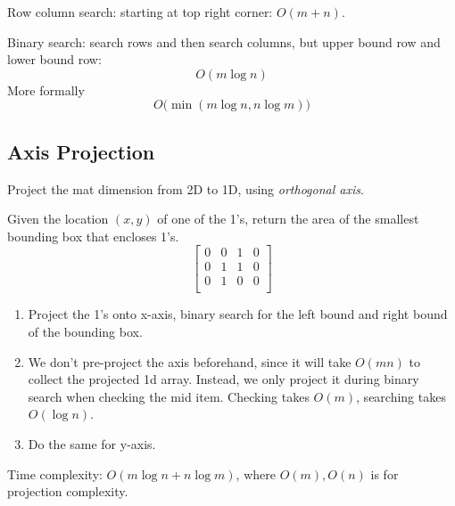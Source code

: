 Row column search: starting at top right corner: $O(m+n)$.

Binary search: search rows and then search columns, but upper bound row and lower bound row: 
$$
O(m \log n)
$$
More formally 
$$O\big(\min(m\log n, n\log m)\big)$$
\subsection{Axis Projection}
Project the mat dimension from 2D to 1D, using \textit{orthogonal axis}.

 Given the location $(x, y)$ of one of the 1's, return the area of the smallest bounding box that encloses 1's.
$$
\begin{bmatrix}
0& 0& 1& 0 \\
0& 1& 1& 0 \\
0& 1& 0& 0 \\
\end{bmatrix}
$$

\begin{enumerate}
\item Project the 1's onto x-axis, binary search for the left bound and right bound of the bounding box. 
\item We don't pre-project the axis beforehand, since it will take $O(mn)$ to collect the projected 1d array. Instead, we only project it during binary search when checking the mid item. Checking takes $O(m)$, searching takes $O(\log n)$. 
\item Do the same for y-axis.
\end{enumerate}

Time complexity: $O(m\log n + n \log m)$, where $O(m), O(n)$ is for projection complexity.

